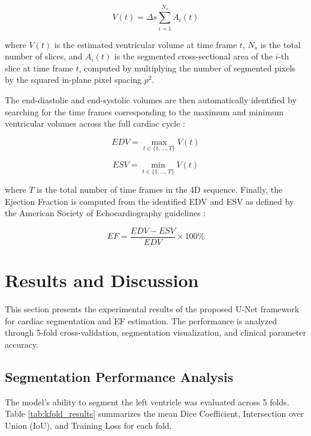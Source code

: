 \documentclass[final,3p,times,twocolumn]{elsarticle}
\begin{document}
\begin{equation}
V(t) = \Delta s \sum_{i=1}^{N_s} A_i(t)
\label{eq:volume}
\end{equation}

\noindent where $V(t)$ is the estimated ventricular volume at time frame $t$, $N_s$ is the total number of slices, and $A_i(t)$ is the segmented cross-sectional area of the $i$-th slice at time frame $t$, computed by multiplying the number of segmented pixels by the squared in-plane pixel spacing $p^2$.

The end-diastolic and end-systolic volumes are then automatically identified by searching for the time frames corresponding to the maximum and minimum ventricular volumes across the full cardiac cycle \cite{b20}:

\begin{equation}
EDV = \max_{t \in \{1,\ldots,T\}} V(t)
\label{eq:edv}
\end{equation}

\begin{equation}
ESV = \min_{t \in \{1,\ldots,T\}} V(t)
\label{eq:esv}
\end{equation}

\noindent where $T$ is the total number of time frames in the 4D sequence. Finally, the Ejection Fraction is computed from the identified EDV and ESV as defined by the American Society of Echocardiography guidelines \cite{b28}:

\begin{equation}
EF = \frac{EDV - ESV}{EDV} \times 100\%
\label{eq:ef}
\end{equation}

\section{Results and Discussion}
\label{sec:results}
This section presents the experimental results of the proposed U-Net framework for cardiac segmentation and EF estimation. The performance is analyzed through 5-fold cross-validation, segmentation visualization, and clinical parameter accuracy.

\subsection{Segmentation Performance Analysis}
The model's ability to segment the left ventricle was evaluated across 5 folds. Table \ref{tab:kfold_results} summarizes the mean Dice Coefficient, Intersection over Union (IoU), and Training Loss for each fold.
\end{document}
